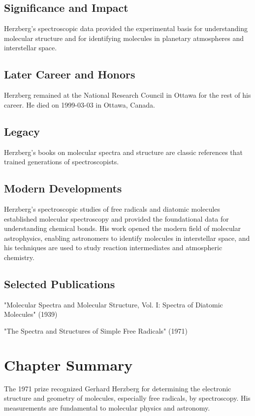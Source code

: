 \subsection*{Significance and Impact}

Herzberg's spectroscopic data provided the experimental basis for understanding molecular structure and for identifying molecules in planetary atmospheres and interstellar space.

\subsection*{Later Career and Honors}

Herzberg remained at the National Research Council in Ottawa for the rest of his career. He died on 1999-03-03 in Ottawa, Canada.

\subsection*{Legacy}

Herzberg's books on molecular spectra and structure are classic references that trained generations of spectroscopists.

\subsection*{Modern Developments}

Herzberg's spectroscopic studies of free radicals and diatomic molecules established molecular spectroscopy and provided the foundational data for understanding chemical bonds. His work opened the modern field of molecular astrophysics, enabling astronomers to identify molecules in interstellar space, and his techniques are used to study reaction intermediates and atmospheric chemistry.

\subsection*{Selected Publications}

"Molecular Spectra and Molecular Structure, Vol. I: Spectra of Diatomic Molecules" (1939)

"The Spectra and Structures of Simple Free Radicals" (1971)

\clearpage

\section*{Chapter Summary}

The 1971 prize recognized Gerhard Herzberg for determining the electronic structure and geometry of molecules, especially free radicals, by spectroscopy. His measurements are fundamental to molecular physics and astronomy.

